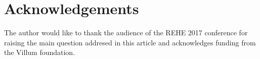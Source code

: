 \section{Acknowledgements}
The author would like to thank the audience of the REHE 2017 conference for
raising the main question addresed in this article
and acknowledges funding from the Villum foundation.
